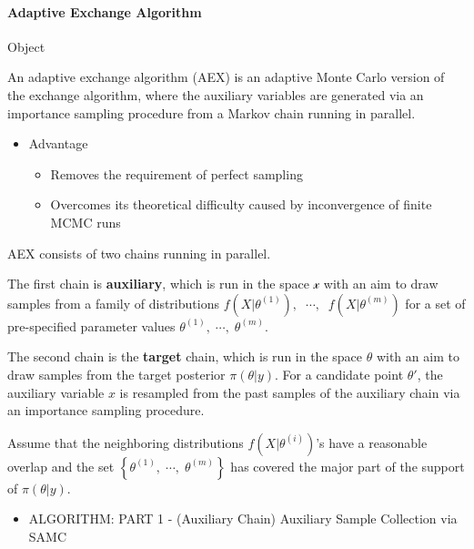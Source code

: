 \documentclass[
]{book}
\providecommand{\tightlist}{%
  \setlength{\itemsep}{0pt}\setlength{\parskip}{0pt}}
\begin{document}
\hypertarget{adaptive-exchange-algorithm}{%
\paragraph{Adaptive Exchange Algorithm}\label{adaptive-exchange-algorithm}}

Object

An adaptive exchange algorithm (AEX) is an adaptive Monte Carlo version of the exchange algorithm, where the auxiliary variables are generated via an importance sampling procedure from a Markov chain running in parallel.

\begin{itemize}
\tightlist
\item
  Advantage

  \begin{itemize}
  \tightlist
  \item
    Removes the requirement of perfect sampling
  \item
    Overcomes its theoretical difficulty caused by inconvergence of finite MCMC runs
  \end{itemize}
\end{itemize}

AEX consists of two chains running in parallel.

The first chain is \textbf{auxiliary}, which is run in the space \({\mathcal{x}}\) with an aim to draw samples from a family of distributions \(f(X \vert \theta^{(1)}), \; \; \cdots, \; \; f(X \vert \theta^{(m)})\) for a set of pre-specified parameter values \(\theta^{(1)}, \; \cdots, \; \theta^{(m)}\).

The second chain is the \textbf{target} chain, which is run in the space \(\theta\) with an aim to draw samples from the target posterior \(\pi(\theta \vert y)\). For a candidate point \(\theta'\), the auxiliary variable \(x\) is resampled from the past samples of the auxiliary chain via an importance sampling procedure.

Assume that the neighboring distributions \(f(X \vert \theta^{(i)})\)'s have a reasonable overlap and the set \(\left \{ \theta^{(1)}, \; \cdots, \; \theta^{(m)} \right \}\) has covered the major part of the support of \(\pi (\theta \vert y)\).

\begin{itemize}
\tightlist
\item
  ALGORITHM: PART 1 - (Auxiliary Chain) Auxiliary Sample Collection via SAMC
\end{itemize}
\end{document}
